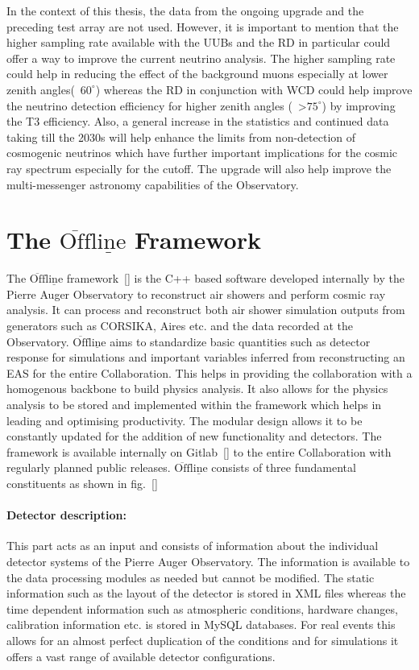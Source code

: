 In the context of this thesis, the data from the ongoing upgrade and the preceding test array are not used. However, it is important to mention that the higher sampling rate available with the UUBs and the RD in particular could offer a way to improve the current neutrino analysis. The higher sampling rate could help in reducing the effect of the background muons especially at lower zenith angles(~$60^{\circ}$) whereas the RD in conjunction with WCD could help improve the neutrino detection efficiency for higher zenith angles (~>$75^{\circ}$) by improving the T3 efficiency. Also, a general increase in the statistics and continued data taking till the 2030s will help enhance the limits from non-detection of cosmogenic neutrinos which have further important implications for the cosmic ray spectrum especially for the cutoff. The upgrade will also help improve the multi-messenger astronomy capabilities of the Observatory. 


\section{The $\mathrm{\overline{Off}\underline{line}}$ Framework}
\label{sec:Offline}
The $\mathrm{\overline{Off}\underline{line}}$ framework~\ref{} is the C++ based software developed internally by the Pierre Auger Observatory to reconstruct air showers and perform cosmic ray analysis. It can process and reconstruct both air shower simulation outputs from generators such as CORSIKA, Aires etc. and the data recorded at the Observatory. $\mathrm{\overline{Off}\underline{line}}$ aims to standardize basic quantities such as detector response for simulations and important variables inferred from reconstructing an EAS for the entire Collaboration. This helps in providing the collaboration with a homogenous backbone to build physics analysis. It also allows for the physics analysis to be stored and implemented within the framework which helps in leading and optimising productivity. The modular design allows it to be constantly updated for the addition of new functionality and detectors. The framework is available internally on Gitlab~\ref{} to the entire Collaboration with regularly planned public releases. $\mathrm{\overline{Off}\underline{line}}$ consists of three fundamental constituents as shown in fig.~\ref{}

\paragraph*{Detector description:}
This part acts as an input and consists of information about the individual detector systems of the Pierre Auger Observatory. The information is available to the data processing modules as needed but cannot be modified. The static information such as the layout of the detector is stored in XML files whereas the time dependent information such as atmospheric conditions, hardware changes, calibration information etc. is stored in MySQL databases. For real events this allows for an almost perfect duplication of the conditions and for simulations it offers a vast range of available detector configurations.  

